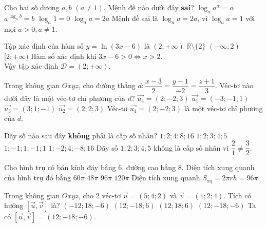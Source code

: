 \begin{ex}%
Cho hai số dương $a,b$ $(a\ne 1)$. Mệnh đề nào dưới đây \textbf{sai}?
\choice
{$\log_a a^{\alpha}=\alpha$}
{$a^{\log_a b}=b$}
{$\log_a 1=0$}
{\True $\log_a a=2a$}
\loigiai
{
Mệnh đề sai là $\log_a a=2a$, vì $\log_aa=1$ với mọi $a>0,a\ne 1$.
}
\end{ex}

\begin{ex}%
Tập xác định của hàm số $y=\ln (3x-6)$ là
\choice
{\True $(2;+\infty)$}
{$\mathbb{R}\setminus\{2\}$}
{$(-\infty;2)$}
{$[2;+\infty)$}
\loigiai
{
Hàm số xác định khi $3x-6>0\Leftrightarrow x>2$.\\
Vậy tập xác định $\mathscr{D}=(2;+\infty)$.
}
\end{ex}

\begin{ex}%
Trong không gian $O x y z$, cho đường thẳng $d\colon\dfrac{x-3}{2}=\dfrac{y-1}{-2}=\dfrac{z+1}{3}$. Véc-tơ nào dưới đây là một véc-tơ chỉ phương của $d$?
\choice
{\True $\overrightarrow{u_4}=(2;-2;3)$}
{$\overrightarrow{u_1}=(-3;-1;1)$}
{$\overrightarrow{u_3}=(3;1;-1)$}
{$\overrightarrow{u_2}=(2;2;3)$}
\loigiai
{
Véc-tơ $\overrightarrow{u_4}=(2;-2;3)$ là một véc-tơ chỉ phương của $d$.
}
\end{ex}

\begin{ex}%
Dãy số nào sau đây \textbf{không} phải là cấp số nhân?
\choice
{$1;2;4;8;16$}
{\True $1;2;3;4;5$}
{$1;-1;1;-1;1$}
{$1;-2;4;-8;16$}
\loigiai
{
Dãy số $1;2;3;4;5$ không là cấp số nhân vì $\dfrac{2}{1}\ne \dfrac{3}{2}$.
}
\end{ex}

\begin{ex}%
Cho hình trụ có bán kính đáy bằng 6, đường cao bằng 8. Diện tích xung quanh của hình trụ đó bằng
\choice
{$60\pi$}
{$48\pi$}
{\True $96\pi$}
{$120\pi$}
\loigiai
{
Diện tích xung quanh $S_{\text{xq}}=2\pi rh=96\pi$.
}
\end{ex}

\begin{ex}%
Trong không gian $O x y z$, cho 2 véc-tơ $\overrightarrow{u}=(5;4;2)$ và $\overrightarrow{v}=(1;2;4)$. Tích có hướng $[\overrightarrow{u},\overrightarrow{v}]$ là?
\choice
{$(-12;18;-6)$}
{$(12;-18;6)$}
{$(12;18;6)$}
{\True $(12;-18;-6)$}
\loigiai
{
Ta có $[\overrightarrow{u},\overrightarrow{v}]=(12;-18;-6)$.
}
\end{ex}

